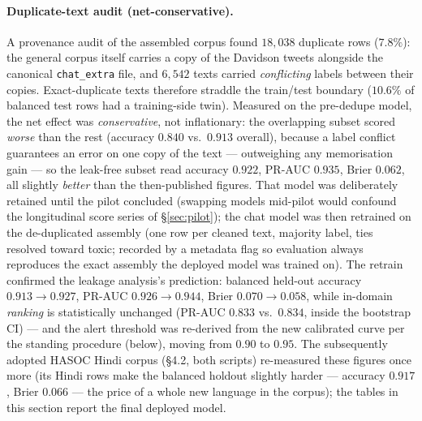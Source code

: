 \documentclass[11pt,a4paper]{article}
\begin{document}
\paragraph{Duplicate-text audit (net-conservative).} A provenance audit of the
assembled corpus found $18{,}038$ duplicate rows ($7.8\%$): the general corpus
itself carries a copy of the Davidson tweets alongside the canonical
\texttt{chat\_extra} file, and $6{,}542$ texts carried \emph{conflicting} labels
between their copies. Exact-duplicate texts therefore straddle the train/test
boundary ($10.6\%$ of balanced test rows had a training-side twin). Measured on
the pre-dedupe model, the net effect was \emph{conservative}, not inflationary:
the overlapping subset scored \emph{worse} than the rest (accuracy $0.840$ vs.\
$0.913$ overall), because a label conflict guarantees an error on one copy of the
text --- outweighing any memorisation gain --- so the leak-free subset read
accuracy $0.922$, PR-AUC $0.935$, Brier $0.062$, all slightly \emph{better} than
the then-published figures. That model was deliberately retained until the pilot
concluded (swapping models mid-pilot would confound the longitudinal score series
of \S\ref{sec:pilot}); the chat model was then retrained on the de-duplicated
assembly (one row per cleaned text, majority label, ties resolved toward toxic;
recorded by a metadata flag so evaluation always reproduces the exact assembly
the deployed model was trained on). The retrain confirmed the leakage analysis's
prediction: balanced held-out accuracy $0.913 \rightarrow 0.927$, PR-AUC
$0.926 \rightarrow 0.944$, Brier $0.070 \rightarrow 0.058$, while in-domain
\emph{ranking} is statistically unchanged (PR-AUC $0.833$ vs.\ $0.834$, inside
the bootstrap CI) --- and the alert threshold was re-derived from the new
calibrated curve per the standing procedure (below), moving from $0.90$ to
$0.95$. The subsequently adopted HASOC Hindi corpus (\S4.2, both scripts)
re-measured these figures once more (its Hindi rows make the balanced holdout
slightly harder --- accuracy $0.917$, Brier $0.066$ --- the price of a whole new
language in the corpus); the tables in this section report the final deployed
model.
\end{document}
